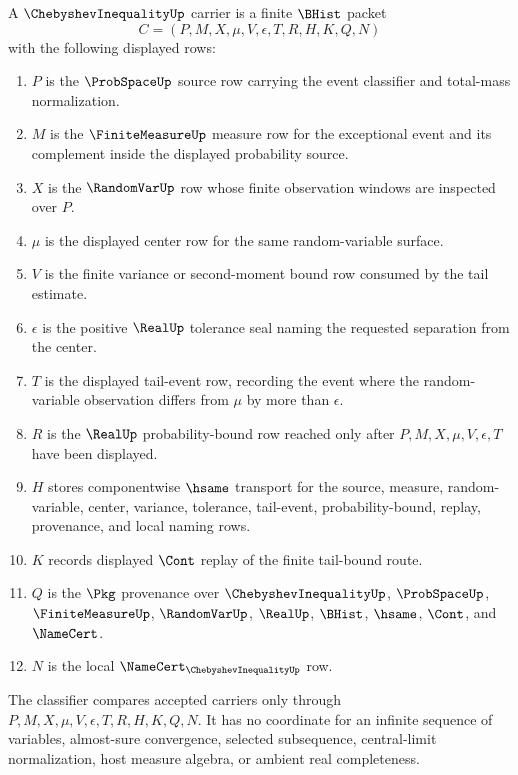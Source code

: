 \begin{definition}\label{def:chebyshev-inequality-carrier}
A $\ChebyshevInequalityUp$ carrier is a finite $\BHist$ packet
$$
C=(P,M,X,\mu,V,\epsilon,T,R,H,K,Q,N)
$$
with the following displayed rows:
\begin{enumerate}
\item $P$ is the $\ProbSpaceUp$ source row carrying the event classifier and total-mass normalization.
\item $M$ is the $\FiniteMeasureUp$ measure row for the exceptional event and its complement inside the displayed probability source.
\item $X$ is the $\RandomVarUp$ row whose finite observation windows are inspected over $P$.
\item $\mu$ is the displayed center row for the same random-variable surface.
\item $V$ is the finite variance or second-moment bound row consumed by the tail estimate.
\item $\epsilon$ is the positive $\RealUp$ tolerance seal naming the requested separation from the center.
\item $T$ is the displayed tail-event row, recording the event where the random-variable observation differs from $\mu$ by more than $\epsilon$.
\item $R$ is the $\RealUp$ probability-bound row reached only after $P,M,X,\mu,V,\epsilon,T$ have been displayed.
\item $H$ stores componentwise $\hsame$ transport for the source, measure, random-variable, center, variance, tolerance, tail-event, probability-bound, replay, provenance, and local naming rows.
\item $K$ records displayed $\Cont$ replay of the finite tail-bound route.
\item $Q$ is the $\Pkg$ provenance over $\ChebyshevInequalityUp$, $\ProbSpaceUp$, $\FiniteMeasureUp$, $\RandomVarUp$, $\RealUp$, $\BHist$, $\hsame$, $\Cont$, and $\NameCert$.
\item $N$ is the local $\NameCert_{\ChebyshevInequalityUp}$ row.
\end{enumerate}
The classifier compares accepted carriers only through $P,M,X,\mu,V,\epsilon,T,R,H,K,Q,N$. It has no coordinate for an infinite sequence of variables, almost-sure convergence, selected subsequence, central-limit normalization, host measure algebra, or ambient real completeness.
\end{definition}

